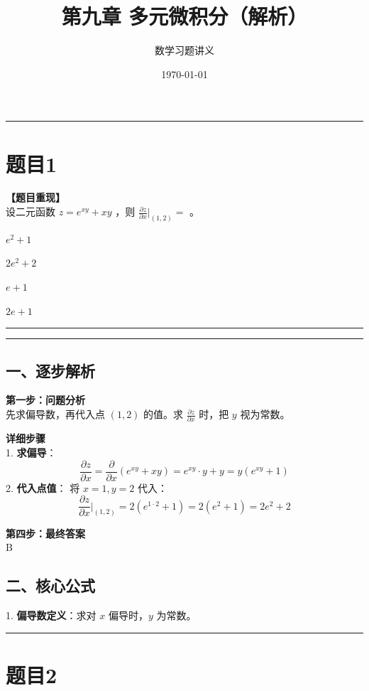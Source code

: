 \documentclass[12pt, a4paper]{ctexart}
\newcommand{\TopSeparator}{
    \par\noindent\rule{\textwidth}{1.5pt}\vspace{0.5em} %
}
\newcommand{\AnalysisSeparator}{
    \par\noindent\rule{\textwidth}{0.5pt}\vspace{0.2em}\hrule\vspace{0.5em} %
}
\newenvironment{RedAnalysis}{
    \par
    \color{red} %
}{
    \par
    \color{black} %
}
\newcommand{\choicesFour}[4]{
    \begin{enumerate}[label=\Alph*., itemsep=0pt, parsep=0pt, topsep=5pt, labelsep=0.5em]
        \begin{minipage}{0.22\linewidth} \item #1 \end{minipage}
        \begin{minipage}{0.22\linewidth} \item #2 \end{minipage}
        \begin{minipage}{0.22\linewidth} \item #3 \end{minipage}
        \begin{minipage}{0.22\linewidth} \item #4 \end{minipage}
    \end{enumerate}
}
\begin{document}
\title{\textbf{第九章 多元微积分（解析）}}
\author{数学习题讲义}
\date{\today}
\maketitle

\TopSeparator
\section*{题目1}

\textbf{【题目重现】} \\
设二元函数 $ z = e^{xy} + xy $ ，则 $ \frac{\partial z}{\partial x}|_{(1,2)} = $ \underline{\hspace{1cm}}。
\choicesFour{$ e^{2}+1 $}{$ 2e^{2}+2 $}{$ e+1 $}{$ 2e+1 $}

\AnalysisSeparator

\begin{RedAnalysis}

\subsection*{一、逐步解析}

\textbf{第一步：问题分析} \\
先求偏导数，再代入点 $(1,2)$ 的值。求 $\frac{\partial z}{\partial x}$ 时，把 $y$ 视为常数。

\textbf{详细步骤} \\
1. \textbf{求偏导}：
   \[ \frac{\partial z}{\partial x} = \frac{\partial}{\partial x}(e^{xy} + xy) = e^{xy} \cdot y + y = y(e^{xy} + 1) \]
2. \textbf{代入点值}：
   将 $x=1, y=2$ 代入：
   \[ \frac{\partial z}{\partial x}|_{(1,2)} = 2(e^{1 \cdot 2} + 1) = 2(e^2 + 1) = 2e^2 + 2 \]

\textbf{第四步：最终答案} \\
B

\subsection*{二、核心公式}
1. \textbf{偏导数定义}：求对 $x$ 偏导时，$y$ 为常数。

\end{RedAnalysis}

\vspace{2em}

\TopSeparator
\section*{题目2}
\end{document}
